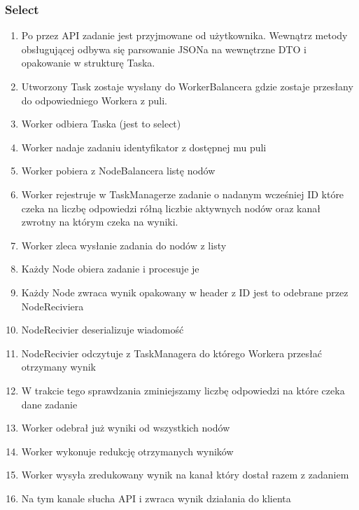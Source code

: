 \documentclass[paper=a4, fontsize=11pt]{scrartcl} %
\numberwithin{equation}{section} %
\numberwithin{figure}{section} %
\numberwithin{table}{section} %
\begin{document}
	\subsubsection{Select}
		\begin{enumerate}
			\item Po przez API zadanie jest przyjmowane od użytkownika. Wewnątrz metody obsługującej odbywa się parsowanie JSONa na wewnętrzne DTO i opakowanie w strukturę Taska. 
			\item Utworzony Task zostaje wysłany do WorkerBalancera gdzie zostaje przesłany do odpowiedniego Workera z puli.
			\item Worker odbiera Taska (jest to select) 		
			\item Worker nadaje zadaniu identyfikator z dostępnej mu puli
			\item Worker pobiera z NodeBalancera listę nodów
			\item Worker rejestruje w TaskManagerze zadanie o nadanym wcześniej ID które czeka na liczbę odpowiedzi rółną liczbie aktywnych nodów
			oraz kanał zwrotny na którym czeka na wyniki. 
			\item Worker zleca wysłanie zadania do nodów z listy
			\item Każdy Node obiera zadanie i procesuje je
			\item Każdy Node zwraca wynik opakowany w header z ID jest to odebrane przez NodeReciviera 
			\item NodeRecivier deserializuje wiadomość 
			\item NodeRecivier odczytuje z TaskManagera do którego Workera przesłać otrzymany wynik
			\item W trakcie tego sprawdzania zminiejszamy liczbę odpowiedzi na które czeka dane zadanie
			\item Worker odebrał już wyniki od wszystkich nodów 
			\item Worker wykonuje redukcję otrzymanych wyników
			\item Worker wysyła zredukowany wynik na kanał który dostał razem z zadaniem
			\item Na tym kanale słucha API i zwraca wynik działania do klienta
		\end{enumerate}
\end{document}
